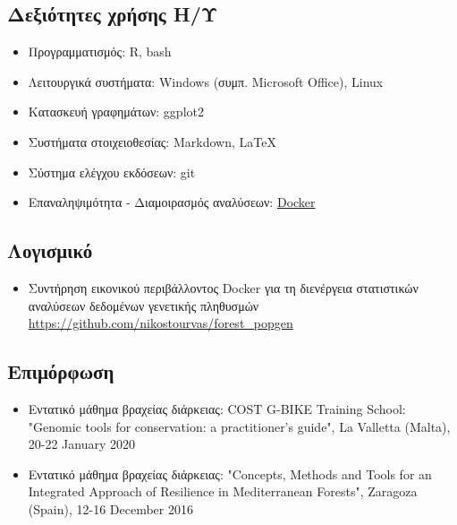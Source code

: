 \documentclass[12pt,]{scrartcl}
\begin{document}
\subsection{Δεξιότητες χρήσης Η/Υ}\label{it}
\begin{itemize}
\vspace{-3mm}
\setlength\itemsep{-0.6em}
\item Προγραμματισμός: R, bash
\item Λειτουργικά συστήματα: Windows (συμπ. Microsoft Office), Linux
\item Κατασκευή γραφημάτων: ggplot2 %
\item Συστήματα στοιχειοθεσίας: Markdown, \LaTeX
\item Σύστημα ελέγχου εκδόσεων: git
\item Επαναληψιμότητα - Διαμοιρασμός αναλύσεων: \href{https://arxiv.org/pdf/1410.0846.pdf}{Docker}
\end{itemize}

\subsection{Λογισμικό}\label{software}
\begin{itemize}
\vspace{-3mm}
\setlength\itemsep{-0.6em}

\item Συντήρηση εικονικού περιβάλλοντος Docker για τη διενέργεια στατιστικών αναλύσεων δεδομένων γενετικής πληθυσμών 
\href{https://github.com/nikostourvas/forest_popgen}{https://github.com/nikostourvas/forest\_popgen}

\end{itemize}

\subsection{Επιμόρφωση}\label{courses}
\begin{itemize}
\vspace{-3mm}
\setlength\itemsep{-0.6em}

\item Εντατικό μάθημα βραχείας διάρκειας:
COST G-BIKE Training School: "Genomic tools for conservation: a practitioner’s guide", La Valletta (Malta), 20-22 January 2020

\item Εντατικό μάθημα βραχείας διάρκειας: "Concepts, Methods and Tools for an Integrated Approach of Resilience in Mediterranean Forests", Zaragoza (Spain), 12-16 December 2016

\end{itemize}
\end{document}
